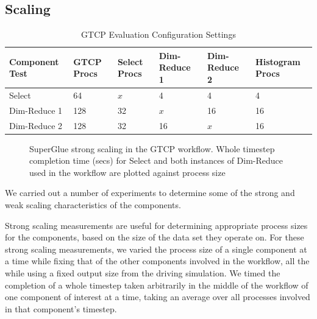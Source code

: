 \subsection{Scaling}

\begin{table}[tbp]
  \centering
  \caption{GTCP Evaluation Configuration Settings}
  \label{tab:eval-strong-gtcp}
  \vspace{-0.05in}
  \begin{tabular}{|l|l|l|l|l|l|}
    \hline
    Component Test & GTCP Procs & Select Procs & Dim-Reduce 1 & Dim-Reduce 2 & Histogram Procs \\
    \hline
    Select & 64 & $x$ & 4 & 4 & 4\\
    \hline
    Dim-Reduce 1 & 128 & 32 & $x$ & 16 & 16\\
    \hline
    Dim-Reduce 2 & 128 & 32 & 16 & $x$ & 16\\
    \hline
  \end{tabular}
  \vspace{-0.07in}
\end{table}

\begin{figure}
  \centering
  
  
  \caption{SuperGlue strong scaling in the GTCP workflow. Whole timestep
    completion time (secs) for Select and both instances of Dim-Reduce used in
    the workflow are plotted against process size}
  \label{fig:gtcp-strong}
  \vspace{-0.25in}
\end{figure}

We carried out a number of experiments
to determine some of the strong and weak scaling
characteristics of the components.

Strong scaling measurements are useful for
determining appropriate process sizes
for the components, based on the size of the
data set they operate on.
For these strong scaling measurements,
we varied the process size of a single component at
a time while fixing that of the
other components involved in the workflow,
all the while using a fixed output size from
the driving simulation.
We timed the completion of a whole timestep
taken arbitrarily in the middle of the workflow
of one component of interest at a time,
taking an average over all processes
involved in that component's timestep.

